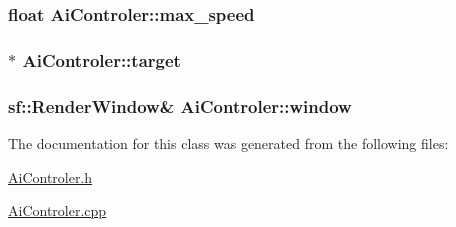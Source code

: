 \subsubsection[{max\+\_\+speed}]{\setlength{\rightskip}{0pt plus 5cm}float Ai\+Controler\+::max\+\_\+speed\hspace{0.3cm}{\ttfamily [private]}}\label{class_ai_controler_ab541f013a1b6ba763ec1bc4c183816d0}
\hypertarget{class_ai_controler_aa0130bc7fd057f94accf3aa3d542173b}{}
\subsubsection[{target}]{$\ast$ Ai\+Controler\+::target\hspace{0.3cm}{\ttfamily [private]}}\label{class_ai_controler_aa0130bc7fd057f94accf3aa3d542173b}
\hypertarget{class_ai_controler_ac352e418d681e34fb822a1d70c84fb05}{}
\subsubsection[{window}]{\setlength{\rightskip}{0pt plus 5cm}sf\+::\+Render\+Window\& Ai\+Controler\+::window\hspace{0.3cm}{\ttfamily [private]}}\label{class_ai_controler_ac352e418d681e34fb822a1d70c84fb05}


The documentation for this class was generated from the following files\+:\begin{DoxyCompactItemize}
\item 
\hyperlink{_ai_controler_8h}{Ai\+Controler.\+h}\item 
\hyperlink{_ai_controler_8cpp}{Ai\+Controler.\+cpp}\end{DoxyCompactItemize}
